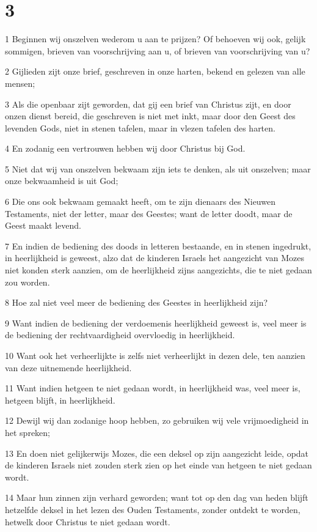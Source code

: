 \chapter{3}

\par 1 Beginnen wij onszelven wederom u aan te prijzen? Of behoeven wij ook, gelijk sommigen, brieven van voorschrijving aan u, of brieven van voorschrijving van u?
\par 2 Gijlieden zijt onze brief, geschreven in onze harten, bekend en gelezen van alle mensen;
\par 3 Als die openbaar zijt geworden, dat gij een brief van Christus zijt, en door onzen dienst bereid, die geschreven is niet met inkt, maar door den Geest des levenden Gods, niet in stenen tafelen, maar in vlezen tafelen des harten.
\par 4 En zodanig een vertrouwen hebben wij door Christus bij God.
\par 5 Niet dat wij van onszelven bekwaam zijn iets te denken, als uit onszelven; maar onze bekwaamheid is uit God;
\par 6 Die ons ook bekwaam gemaakt heeft, om te zijn dienaars des Nieuwen Testaments, niet der letter, maar des Geestes; want de letter doodt, maar de Geest maakt levend.
\par 7 En indien de bediening des doods in letteren bestaande, en in stenen ingedrukt, in heerlijkheid is geweest, alzo dat de kinderen Israels het aangezicht van Mozes niet konden sterk aanzien, om de heerlijkheid zijns aangezichts, die te niet gedaan zou worden.
\par 8 Hoe zal niet veel meer de bediening des Geestes in heerlijkheid zijn?
\par 9 Want indien de bediening der verdoemenis heerlijkheid geweest is, veel meer is de bediening der rechtvaardigheid overvloedig in heerlijkheid.
\par 10 Want ook het verheerlijkte is zelfs niet verheerlijkt in dezen dele, ten aanzien van deze uitnemende heerlijkheid.
\par 11 Want indien hetgeen te niet gedaan wordt, in heerlijkheid was, veel meer is, hetgeen blijft, in heerlijkheid.
\par 12 Dewijl wij dan zodanige hoop hebben, zo gebruiken wij vele vrijmoedigheid in het spreken;
\par 13 En doen niet gelijkerwijs Mozes, die een deksel op zijn aangezicht leide, opdat de kinderen Israels niet zouden sterk zien op het einde van hetgeen te niet gedaan wordt.
\par 14 Maar hun zinnen zijn verhard geworden; want tot op den dag van heden blijft hetzelfde deksel in het lezen des Ouden Testaments, zonder ontdekt te worden, hetwelk door Christus te niet gedaan wordt.
